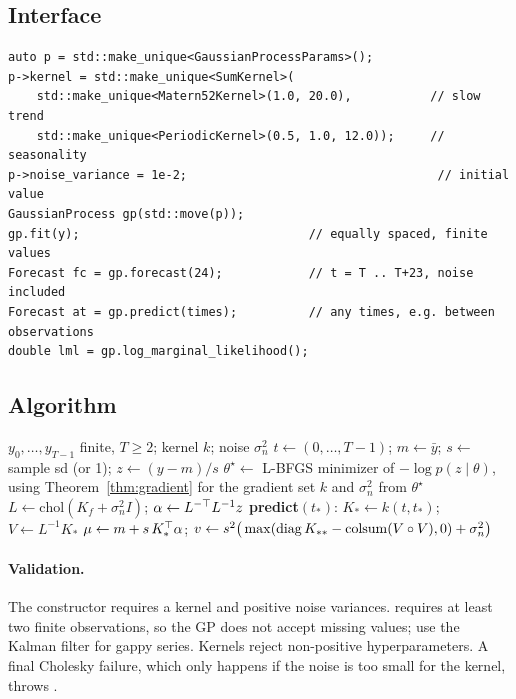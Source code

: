 \documentclass[11pt,a4paper]{article}
\begin{document}
\subsection{Interface}
\begin{lstlisting}
auto p = std::make_unique<GaussianProcessParams>();
p->kernel = std::make_unique<SumKernel>(
    std::make_unique<Matern52Kernel>(1.0, 20.0),           // slow trend
    std::make_unique<PeriodicKernel>(0.5, 1.0, 12.0));     // seasonality
p->noise_variance = 1e-2;                                   // initial value
GaussianProcess gp(std::move(p));
gp.fit(y);                                // equally spaced, finite values
Forecast fc = gp.forecast(24);            // t = T .. T+23, noise included
Forecast at = gp.predict(times);          // any times, e.g. between observations
double lml = gp.log_marginal_likelihood();
\end{lstlisting}

\subsection{Algorithm}
\begin{algorithm}[ht]
\caption{ and }\label{alg:gp}
\begin{algorithmic}[1]
\Require $y_0,\dots,y_{T-1}$ finite, $T\ge2$; kernel $k$; noise $\sigma_n^2$
\State $t\gets(0,\dots,T-1)$;\; $m\gets\bar y$;\; $s\gets$ sample sd (or 1);\; $z\gets(y-m)/s$
  \State $\theta^\star\gets$ L-BFGS minimizer of $-\log p(z\mid\theta)$, using Theorem~\ref{thm:gradient} for the gradient
  \State set $k$ and $\sigma_n^2$ from $\theta^\star$
\EndIf
\State $L\gets\mathrm{chol}(K_f+\sigma_n^2I)$;\; $\alpha\gets L^{-\top}L^{-1}z$ 
\Statex \textbf{predict}$(t_*)$:
\State $K_*\gets k(t,t_*)$;\; $V\gets L^{-1}K_*$
\State $\mu\gets m+s\,K_*^\top\alpha$;\; $v\gets s^2\big(\max(\operatorname{diag} K_{**}-\mathrm{colsum}(V\circ V),0)+\sigma_n^2\big)$
\end{algorithmic}
\end{algorithm}

\paragraph{Validation.} The constructor requires a kernel and positive noise
variances.  requires at least two finite observations, so the GP does not
accept missing values; use the Kalman filter for gappy series. Kernels
reject non-positive hyperparameters. A final Cholesky failure, which only happens if the
noise is too small for the kernel, throws .
\end{document}
